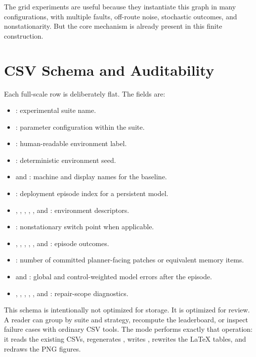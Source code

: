 \documentclass{article}
\begin{document}
The grid experiments are useful because they instantiate this graph in many configurations, with multiple faults, off-route noise, stochastic outcomes, and nonstationarity. But the core mechanism is already present in this finite construction.

\section{CSV Schema and Auditability}

Each full-scale row is deliberately flat. The fields are:
\begin{itemize}
    \item {}: experimental suite name.
    \item {}: parameter configuration within the suite.
    \item {}: human-readable environment label.
    \item {}: deterministic environment seed.
    \item {} and : machine and display names for the baseline.
    \item {}: deployment episode index for a persistent model.
    \item {}, , , , , and : environment descriptors.
    \item {}: nonstationary switch point when applicable.
    \item {}, , , , , and : episode outcomes.
    \item {}: number of committed planner-facing patches or equivalent memory items.
    \item {} and : global and control-weighted model errors after the episode.
    \item {}, , , , , and : repair-scope diagnostics.
\end{itemize}

This schema is intentionally not optimized for storage. It is optimized for review. A reader can group by suite and strategy, recompute the leaderboard, or inspect failure cases with ordinary CSV tools. The  mode performs exactly that operation: it reads the existing CSVs, regenerates , writes , rewrites the LaTeX tables, and redraws the PNG figures.
\end{document}
